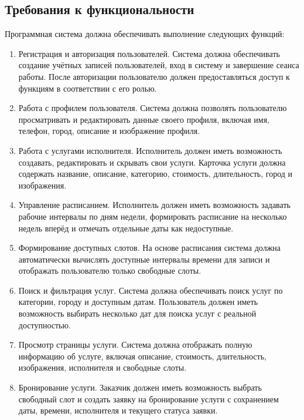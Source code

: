 \subsection{Требования к функциональности}

Программная система должна обеспечивать выполнение следующих функций:
\begin{enumerate}
	\item Регистрация и авторизация пользователей.  
	Система должна обеспечивать создание учётных записей пользователей, вход в систему и завершение сеанса работы. После авторизации пользователю должен предоставляться доступ к функциям в соответствии с его ролью.
	
	\item Работа с профилем пользователя.  
	Система должна позволять пользователю просматривать и редактировать данные своего профиля, включая имя, телефон, город, описание и изображение профиля.
	
	\item Работа с услугами исполнителя.  
	Исполнитель должен иметь возможность создавать, редактировать и скрывать свои услуги. Карточка услуги должна содержать название, описание, категорию, стоимость, длительность, город и изображения.
	
	\item Управление расписанием.  
	Исполнитель должен иметь возможность задавать рабочие интервалы по дням недели, формировать расписание на несколько недель вперёд и отмечать отдельные даты как недоступные.
	
	\item Формирование доступных слотов.  
	На основе расписания система должна автоматически вычислять доступные интервалы времени для записи и отображать пользователю только свободные слоты.
	
	\item Поиск и фильтрация услуг.  
	Система должна обеспечивать поиск услуг по категории, городу и доступным датам. Пользователь должен иметь возможность выбирать несколько дат для поиска услуг с реальной доступностью.
	
	\item Просмотр страницы услуги.  
	Система должна отображать полную информацию об услуге, включая описание, стоимость, длительность, изображения, исполнителя и свободные слоты.
	
	\item Бронирование услуги.  
	Заказчик должен иметь возможность выбрать свободный слот и создать заявку на бронирование услуги с сохранением даты, времени, исполнителя и текущего статуса заявки.
	

\end{enumerate}
